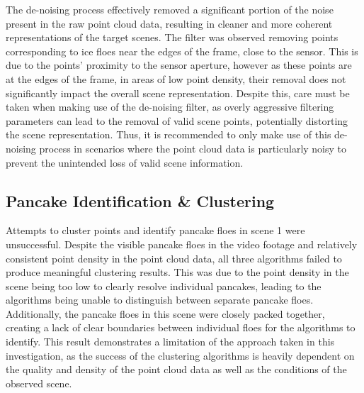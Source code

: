 The de-noising process effectively removed a significant portion of the noise present in the raw point cloud data, resulting in cleaner and more coherent representations of the target scenes. The filter was observed removing points corresponding to ice floes near the edges of the frame, close to the sensor. This is due to the points' proximity to the sensor aperture, however as these points are at the edges of the frame, in areas of low point density, their removal does not significantly impact the overall scene representation. Despite this, care must be taken when making use of the de-noising filter, as overly aggressive filtering parameters can lead to the removal of valid scene points, potentially distorting the scene representation. Thus, it is recommended to only make use of this de-noising process in scenarios where the point cloud data is particularly noisy to prevent the unintended loss of valid scene information.

\subsection{Pancake Identification \& Clustering}
\label{sec:ch8.section2.subsec2}

Attempts to cluster points and identify pancake floes in scene 1 were unsuccessful. Despite the visible pancake floes in the video footage and relatively consistent point density in the point cloud data, all three algorithms failed to produce meaningful clustering results. This was due to the point density in the scene being too low to clearly resolve individual pancakes, leading to the algorithms being unable to distinguish between separate pancake floes. Additionally, the pancake floes in this scene were closely packed together, creating a lack of clear boundaries between individual floes for the algorithms to identify. This result demonstrates a limitation of the approach taken in this investigation, as the success of the clustering algorithms is heavily dependent on the quality and density of the point cloud data as well as the conditions of the observed scene.

